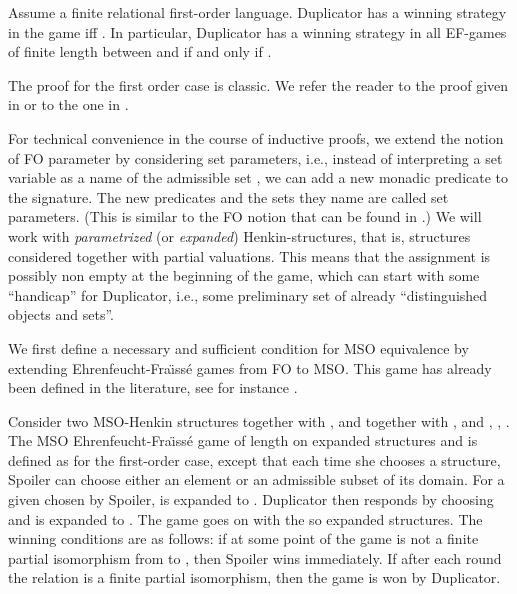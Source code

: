 \documentclass{LMCS}
\newcommand{\fo}{\textsf{FO}\xspace}
\newcommand{\mso}{\textsf{MSO}\xspace}
\begin{document}
\begin{thm}[\fo Adequacy]\label{thm:effo}
  Assume a finite relational first-order language. Duplicator has a winning strategy in the game
   iff . In particular,
  Duplicator has a winning strategy in all EF-games of finite length
  between  and  if and only if .
\end{thm}


The proof for the first order case is classic. We refer the reader
to the proof given in \cite{ebfl95} or to the one in \cite{leo}.

For technical convenience in the course of inductive proofs,
we extend the notion of \fo parameter by considering set
parameters, i.e., instead of interpreting a set variable as a name
of the admissible set , we can add a new monadic predicate  to the
signature. The new predicates and the sets they name are called
set parameters. (This is similar to the \fo notion that can be
found in \cite{97}.) We will work with \emph{parametrized} (or \emph{expanded}) Henkin-structures, that is, structures considered together with partial
valuations. This means that the assignment is possibly non empty at the beginning of the game, which can start with some ``handicap'' for Duplicator, i.e., some preliminary set of already ``distinguished objects and sets''.

We first define a necessary and sufficient condition for \mso
equivalence by extending Ehrenfeucht-Fra\"{\i}ss\'e games from
\fo to \mso. This game has already been defined in the literature, see for instance \cite{1998}.




\begin{defi}[\mso Ehrenfeucht-Fra\"\i ss\'e Game]
Consider two \mso-Henkin structures  together with ,
 and  together with ,  and , , . The \mso
Ehrenfeucht-Fra\"{\i}ss\'e game  of length  on expanded structures
 and  is
defined as for the first-order case, except that each time she
chooses a structure, Spoiler can choose either an element or an
admissible subset of its domain. For a given  chosen by Spoiler, 
is expanded to . Duplicator
then responds by choosing  and
 is expanded to . The game goes on with the so expanded structures.
The winning conditions are as follows: if at some point of the
game  is not a finite partial isomorphism
from  to ,
then Spoiler wins immediately. If after each round the relation is
a finite partial isomorphism, then the game is won by
Duplicator.
\label{efmso}
\end{defi}
\end{document}
